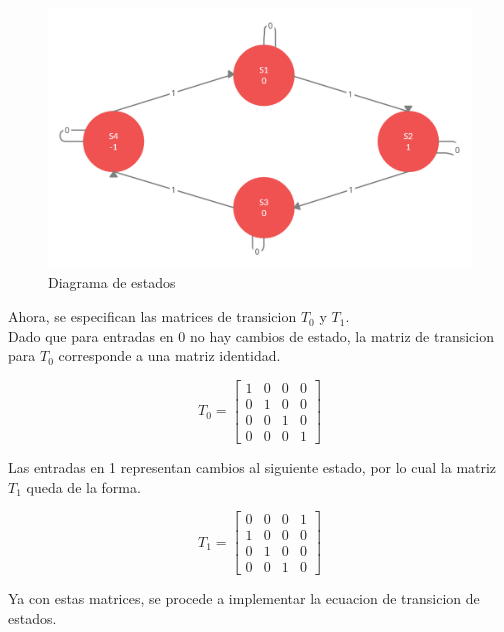 \begin{figure}[H]
    \centering
    \includegraphics[width=1\textwidth]{laboratorioMLT3/imagenes/Untitled Workspace (1).png}
    \caption{\label{estados}Diagrama de estados}
\end{figure}

Ahora, se especifican las matrices de transicion $T_0$ y $T_1$.
\\
Dado que para entradas en 0 no hay cambios de estado, la matriz de transicion para $T_0$ corresponde a una matriz identidad.

\begin{equation*}
    T_0 = 
    \begin{bmatrix}
        1 & 0 & 0 & 0\\
        0 & 1 & 0 & 0\\
        0 & 0 & 1 & 0\\
        0 & 0 & 0 & 1
    \end{bmatrix}
\end{equation*}

Las entradas en 1 representan cambios al siguiente estado, por lo cual la matriz $T_1$ queda de la forma.

\begin{equation*}
    T_1 = 
    \begin{bmatrix}
        0 & 0 & 0 & 1\\
        1 & 0 & 0 & 0\\
        0 & 1 & 0 & 0\\
        0 & 0 & 1 & 0
    \end{bmatrix}
\end{equation*}

Ya con estas matrices, se procede a implementar la ecuacion de transicion de estados.

